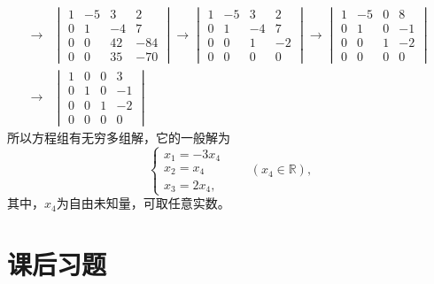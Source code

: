 \begin{solution}
\begin{align*}
\longrightarrow & \begin{vmatrix} 1 & -5 & 3 & 2 \\ 0 & 1 & -4 & 7 \\ 0 & 0 & 42 & -84 \\ 0 & 0 & 35 & -70 \end{vmatrix} \longrightarrow \begin{vmatrix} 1 & -5 & 3 & 2 \\ 0 & 1 & -4 & 7 \\ 0 & 0 & 1 & -2 \\ 0 & 0 & 0 & 0 \end{vmatrix}\longrightarrow \begin{vmatrix} 1 & -5 & 0 & 8 \\ 0 & 1 & 0 & -1 \\ 0 & 0 & 1 & -2 \\ 0 & 0 & 0 & 0 \end{vmatrix} \\
\longrightarrow & \begin{vmatrix} 1 & 0 & 0 & 3 \\ 0 & 1 & 0 & -1 \\ 0 & 0 & 1 & -2 \\ 0 & 0 & 0 & 0 \end{vmatrix}
\end{align*}
所以方程组有无穷多组解，它的一般解为
$$\begin{cases}
x_1 = -3x_4 \\ x_2 = x_4 \\ x_3 = 2x_4,
\end{cases} \qquad (x_4\in\mathbb{R}),$$
其中，$x_4$为自由未知量，可取任意实数。
\end{solution}


\section{课后习题}


